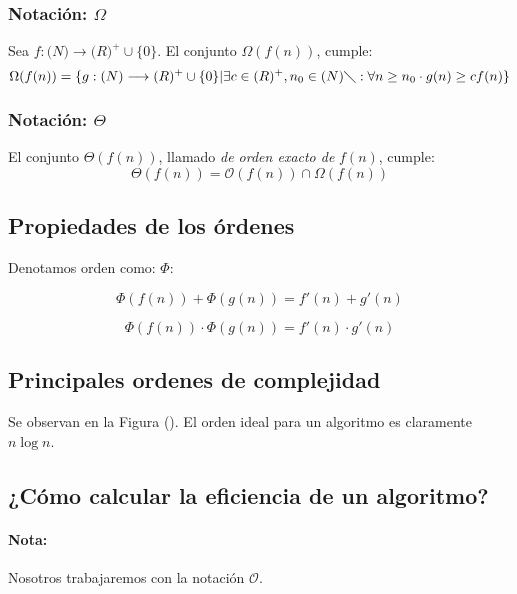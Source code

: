 \subsubsection{Notación: $\Omega$}
 Sea $f: \mathbf(N) \longrightarrow \mathbf(R)^+ \cup \lbrace0\rbrace$. El conjunto $\Omega(f(n))$, cumple: 
\begin{equation}
\Omega(f(n)) = \lbrace g:\mathbf(N) \longrightarrow \mathbf(R)^+ \cup \lbrace 0 \rbrace \vert \exists  c\in \mathbf(R)^+, n_0 \in \mathbf(N) \diagdown: \forall n \geq n_0 \cdot g(n) \geq cf(n)\rbrace
\end{equation}

\subsubsection{Notación: $\Theta$}
 El conjunto $\Theta(f(n))$, llamado \textit{de orden exacto de} $f(n)$, cumple:
\begin{equation}
\Theta(f(n)) = \mathcal{O}(f(n)) \cap \Omega(f(n))
\end{equation}

\subsection{Propiedades de los órdenes}

Denotamos orden como: $\Phi$:

\begin{equation}
\Phi(f(n)) + \Phi(g(n)) = f\prime (n) + g\prime(n)
\end{equation}

\begin{equation}
\Phi(f(n)) \cdot \Phi(g(n)) = f\prime (n) \cdot g\prime(n) 
\end{equation}


\subsection{Principales ordenes de complejidad}
Se observan en la Figura (). El orden ideal para un algoritmo es claramente $n\log n$.



\subsection{¿Cómo calcular la eficiencia de un algoritmo?}
\paragraph*{Nota:} Nosotros trabajaremos con la notación $\mathcal{O}$.
